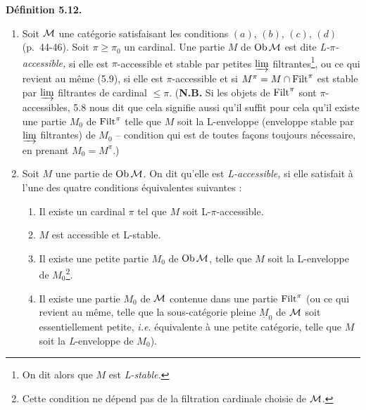 \textbf{Définition 5.12.}
\begin{enumerate}[label={}]
\item[1)] Soit $\mathcal{M}$ une catégorie satisfaisant les conditions $(a)$, $(b)$, $(c)$, $(d)$ (p.~44-46). Soit $\pi \geq \pi_0$ un cardinal. Une partie $M$ de $\operatorname{Ob}\mathcal{M}$ est dite \textit{L-$\pi$-accessible,} si elle est $\pi$-accessible et stable par petites $\varinjlim$ filtrantes\footnote[24]{On dit alors que $M$ est \textit{L-stable.}}, ou ce qui revient au même (5.9), si elle est $\pi$-accessible et si $M^\pi = M \cap \mathrm{Filt}^\pi$ est stable par $\varinjlim$ filtrantes de cardinal $\leq \pi$. (\textbf{N.B.} Si les objets de $\mathrm{Filt}^\pi$ sont $\pi$-accessibles, 5.8 nous dit que cela signifie aussi qu'il suffit pour cela qu'il existe une partie $M_0$ de $\mathrm{Filt}^\pi$ telle que $M$ soit la L-enveloppe (enveloppe stable par $\varinjlim$ filtrantes) de $M_0$ -- condition qui est de toutes façons toujours nécessaire, en prenant $M_0 = M^\pi$.)
\item[2)] Soit $M$ une partie de $\operatorname{Ob}\mathcal{M}$. On dit qu'elle est \textit{L-accessible,} si elle satisfait à l'une des quatre conditions équivalentes suivantes :
\begin{enumerate}[label={}]
\item[\textit{a})] Il existe un cardinal $\pi$ tel que $M$ soit L-$\pi$-accessible.
\item[\textit{a}$'$)] $M$ est accessible et L-stable.
\item[\textit{b})] Il existe une petite partie $M_0$ de $\operatorname{Ob}\mathcal{M}$, telle que $M$ soit la L-enveloppe de $M_0$\footnote[25]{Cette condition ne dépend pas de la filtration cardinale choisie de $\mathcal{M}$.}.
\item[\textit{b}$'$)] Il existe une partie $M_0$ de $\mathcal{M}$ contenue dans une partie $\mathrm{Filt}^\pi$ (ou ce qui revient au même, telle que la sous-catégorie pleine $\underline{M}_0$ de $\mathcal{M}$ soit essentiellement petite, \textit{i.e.} équivalente à une petite catégorie, telle que $M$ soit la \textit{L}-enveloppe de $M_0$).
\end{enumerate}
\end{enumerate}


